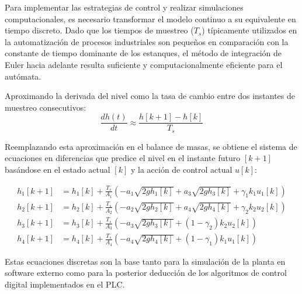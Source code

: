 Para implementar las estrategias de control y realizar simulaciones computacionales, es necesario transformar el modelo continuo a su equivalente en tiempo discreto. Dado que los tiempos de muestreo ($T_s$) típicamente utilizados en la automatización de procesos industriales son pequeños en comparación con la constante de tiempo dominante de los estanques, el método de integración de Euler hacia adelante resulta suficiente y computacionalmente eficiente para el autómata.

Aproximando la derivada del nivel como la tasa de cambio entre dos instantes de muestreo consecutivos:
\begin{equation}
    \frac{dh(t)}{dt} \approx \frac{h[k+1] - h[k]}{T_s}
\end{equation}

Reemplazando esta aproximación en el balance de masas, se obtiene el sistema de ecuaciones en diferencias que predice el nivel en el instante futuro $[k+1]$ basándose en el estado actual $[k]$ y la acción de control actual $u[k]$:

\begin{align}
    h_1[k+1] &= h_1[k] + \frac{T_s}{A_1} \left( -a_1 \sqrt{2g h_1[k]} + a_3 \sqrt{2g h_3[k]} + \gamma_1 k_1 u_1[k] \right) \label{eq:disc_h1} \\
    h_2[k+1] &= h_2[k] + \frac{T_s}{A_2} \left( -a_2 \sqrt{2g h_2[k]} + a_4 \sqrt{2g h_4[k]} + \gamma_2 k_2 u_2[k] \right) \label{eq:disc_h2} \\
    h_3[k+1] &= h_3[k] + \frac{T_s}{A_3} \left( -a_3 \sqrt{2g h_3[k]} + (1-\gamma_2) k_2 u_2[k] \right) \label{eq:disc_h3} \\
    h_4[k+1] &= h_4[k] + \frac{T_s}{A_4} \left( -a_4 \sqrt{2g h_4[k]} + (1-\gamma_1) k_1 u_1[k] \right) \label{eq:disc_h4}
\end{align}

Estas ecuaciones discretas son la base tanto para la simulación de la planta en software externo como para la posterior deducción de los algoritmos de control digital implementados en el PLC.
    
